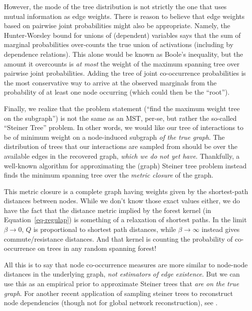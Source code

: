 \documentclass[%
	12pt,
		oneside,
		letterpaper
]{book}
\begin{document}
However, the mode of the tree distribution is not strictly the one that
uses mutual information as edge weights. There is reason to believe that
edge weights based on pairwise joint probabilities might also be
appropriate. Namely, the Hunter-Worsley bound for unions of (dependent)
variables says that the sum of marginal probabilities over-counts the
true union of activations (including by dependence relations). This
alone would be known as Boole's inequality, but the amount it overcounts
is \emph{at most} the weight of the maximum spanning tree over pairwise
joint probabilities.\autocite{upperboundprobability_Hunter1976} Adding
the tree of joint co-occurrence probabilities is the most conservative
way to arrive at the observed marginals from the probability of at least
one node occurring (which could then be the ``root'').

Finally, we realize that the problem statement (``find the maximum
weight tree on the subgraph'') is not the same as an MST, per-se, but
rather the so-called ``Steiner Tree'' problem. In other words, we would
like our tree of interactions to be of minimum weight on a node-induced
subgraph \emph{of the true graph}. The distribution of trees that our
interactions are sampled from should be over the available edges in the
recovered graph, \emph{which we do not yet have}. Thankfully, a
well-known algorithm for approximating the (graph) Steiner tree problem
instead finds the minimum spanning tree over the \emph{metric closure}
of the graph.\autocite{fastalgorithmSteiner_Kou1981}

This metric closure is a complete graph having weights given by the
shortest-path distances between nodes. While we don't know those exact
values either, we do have the fact that the distance metric implied by
the forest kernel (in Equation~\ref{eq-regulap}) is something of a
relaxation of shortest paths. In the limit \(\beta\rightarrow 0\), \(Q\)
is proportional to shortest path distances, while
\(\beta\rightarrow\infty\) instead gives commute/resistance
distances.\autocite{Semisupervisedlearning_Avrachenkov2017} And that
kernel is counting the probability of co-occurrence on trees in any
random spanning forest!

All this is to say that node co-occurrence measures are more similar to
node-node distances in the underlying graph, \emph{not estimators of
edge existence}. But we can use this as an empirical prior to
approximate Steiner trees that \emph{are on the true graph}. For another
recent application of sampling steiner trees to reconstruct node
dependencies (though not for global network reconstruction), see
\textcite{RobustCascadeReconstruction_Xiao2018}.
\end{document}
